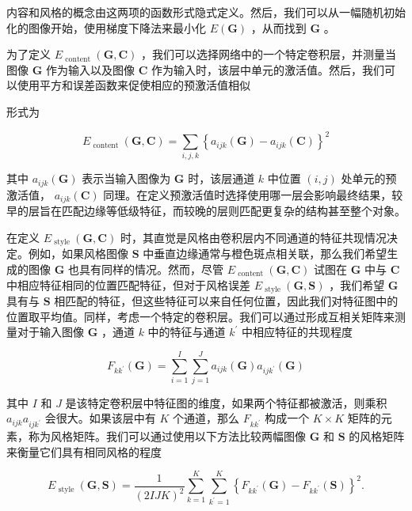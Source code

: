 \documentclass[10pt]{report}
\begin{document}
内容和风格的概念由这两项的函数形式隐式定义。然后，我们可以从一幅随机初始化的图像开始，使用梯度下降法来最小化 \(E\left( \mathbf{G}\right)\) ，从而找到 \(\mathbf{G}\) 。

为了定义 \({E}_{\text{ content }}\left( {\mathbf{G},\mathbf{C}}\right)\) ，我们可以选择网络中的一个特定卷积层，并测量当图像 \(\mathbf{G}\) 作为输入以及图像 \(\mathbf{C}\) 作为输入时，该层中单元的激活值。然后，我们可以使用平方和误差函数来促使相应的预激活值相似

形式为

\[
{E}_{\text{ content }}\left( {\mathbf{G},\mathbf{C}}\right)  = \mathop{\sum }\limits_{{i,j,k}}{\left\{  {a}_{ijk}\left( \mathbf{G}\right)  - {a}_{ijk}\left( \mathbf{C}\right) \right\}  }^{2} \tag{10.14}
\]

其中 \({a}_{ijk}\left( \mathbf{G}\right)\) 表示当输入图像为 \(\mathbf{G}\) 时，该层通道 \(k\) 中位置 \(\left( {i,j}\right)\) 处单元的预激活值， \({a}_{ijk}\left( \mathbf{C}\right)\) 同理。在定义预激活值时选择使用哪一层会影响最终结果，较早的层旨在匹配边缘等低级特征，而较晚的层则匹配更复杂的结构甚至整个对象。

在定义 \({E}_{\text{ style }}\left( {\mathbf{G},\mathbf{C}}\right)\) 时，其直觉是风格由卷积层内不同通道的特征共现情况决定。例如，如果风格图像 \(\mathbf{S}\) 中垂直边缘通常与橙色斑点相关联，那么我们希望生成的图像 \(\mathbf{G}\) 也具有同样的情况。然而，尽管 \({E}_{\text{ content }}\left( {\mathbf{G},\mathbf{C}}\right)\) 试图在 \(\mathbf{G}\) 中与 \(\mathbf{C}\) 中相应特征相同的位置匹配特征，但对于风格误差 \({E}_{\text{ style }}\left( {\mathbf{G},\mathbf{S}}\right)\) ，我们希望 \(\mathbf{G}\) 具有与 \(\mathbf{S}\) 相匹配的特征，但这些特征可以来自任何位置，因此我们对特征图中的位置取平均值。同样，考虑一个特定的卷积层。我们可以通过形成互相关矩阵来测量对于输入图像 \(\mathbf{G}\) ，通道 \(k\) 中的特征与通道 \({k}^{\prime }\) 中相应特征的共现程度

\[
{F}_{k{k}^{\prime }}\left( \mathbf{G}\right)  = \mathop{\sum }\limits_{{i = 1}}^{I}\mathop{\sum }\limits_{{j = 1}}^{J}{a}_{ijk}\left( \mathbf{G}\right) {a}_{{ij}{k}^{\prime }}\left( \mathbf{G}\right)  \tag{10.15}
\]

其中 \(I\) 和 \(J\) 是该特定卷积层中特征图的维度，如果两个特征都被激活，则乘积 \({a}_{ijk}{a}_{{ij}{k}^{\prime }}\) 会很大。如果该层中有 \(K\) 个通道，那么 \({F}_{k{k}^{\prime }}\) 构成一个 \(K \times  K\) 矩阵的元素，称为风格矩阵。我们可以通过使用以下方法比较两幅图像 \(\mathbf{G}\) 和 \(\mathbf{S}\) 的风格矩阵来衡量它们具有相同风格的程度

\[
{E}_{\text{ style }}\left( {\mathbf{G},\mathbf{S}}\right)  = \frac{1}{{\left( 2IJK\right) }^{2}}\mathop{\sum }\limits_{{k = 1}}^{K}\mathop{\sum }\limits_{{{k}^{\prime } = 1}}^{K}{\left\{  {F}_{k{k}^{\prime }}\left( \mathbf{G}\right)  - {F}_{k{k}^{\prime }}\left( \mathbf{S}\right) \right\}  }^{2}. \tag{10.16}
\]
\end{document}
